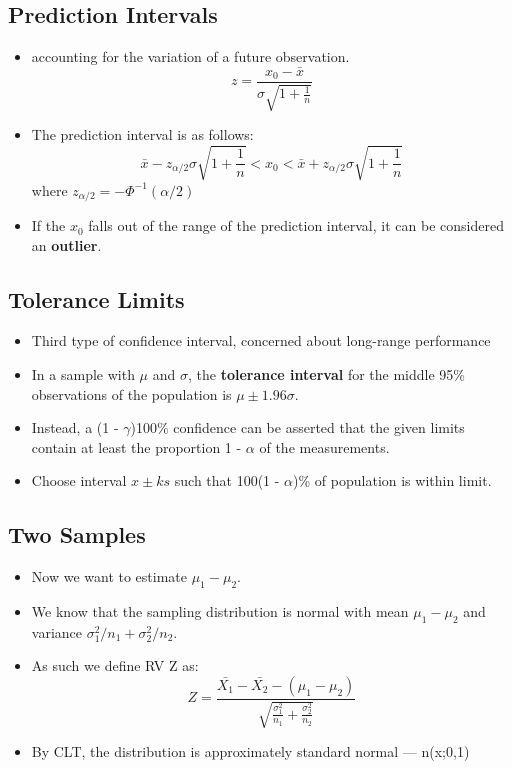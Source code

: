 \documentclass[10pt, letterpaper, twoside]{article}
\begin{document}
\begin{multicols}{2}
\subsection{Prediction Intervals}
\begin{itemize}
    \item accounting for the variation of a future observation.
    \begin{equation*}
        z = \frac{x_0 - \bar{x}}{\sigma\sqrt{1 + \frac{1}{n}}}
    \end{equation*}
    \item The prediction interval is as follows:
    \begin{equation*}
        \bar{x} - z_{\alpha/2}\sigma\sqrt{1 + \frac{1}{n}} < x_0 < \bar{x} + z_{\alpha/2}\sigma\sqrt{1+\frac{1}{n}}
    \end{equation*}
    where $z_{\alpha/2} = -\Phi^{-1}(\alpha/2)$
    \item If the $x_0$ falls out of the range of the prediction interval, it can be considered an \textbf{outlier}.
\end{itemize}
\subsection{Tolerance Limits}
\begin{itemize}
    \item Third type of confidence interval, concerned about long-range performance
    \item In a sample with $\mu$ and $\sigma$, the \textbf{tolerance interval} for the middle 95\% observations of the population is $\mu \pm 1.96\sigma$.
    \item Instead, a (1 - $\gamma$)100\% confidence can be asserted that the given limits contain at least the proportion 1 - $\alpha$ of the measurements.
    \item Choose interval $x\pm ks$ such that 100(1 - $\alpha$)\% of population is within limit.
\end{itemize}

\subsection{Two Samples}
\begin{itemize}
    \item Now we want to estimate $\mu_1 - \mu_2$.
    \item We know that the sampling distribution is normal with mean $\mu_1 - \mu_2$ and variance $\sigma_1^2/n_1 + \sigma_2^2/n_2$.
    \item As such we define RV Z as:
    \begin{equation*}
        Z = \frac{\bar{X_1} - \bar{X_2} - (\mu_1 - \mu_2)}{\sqrt{\frac{\sigma_1^2}{n_1}+ \frac{\sigma_2^2}{n_2}}}
    \end{equation*}
    \item By CLT, the distribution is approximately standard normal --- n(x;0,1)
\end{itemize}

\end{multicols}
\end{document}
